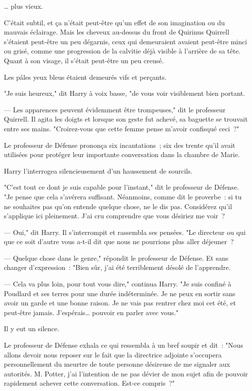 … plus vieux.

C'était subtil, et ça n'était peut-être qu'un effet de son imagination ou du mauvais éclairage. Mais les cheveux au-dessus du front de Quirinus Quirrell s'étaient peut-être un peu dégarnis, ceux qui demeuraient avaient peut-être minci ou grisé, comme une progression de la calvitie déjà visible à l'arrière de sa tête. Quant à son visage, il s'était peut-être un peu creusé.

Les pâles yeux bleus étaient demeurés vifs et perçants.

"Je suis heureux," dit Harry à voix basse, "de vous voir visiblement bien portant.

--- Les apparences peuvent évidemment être trompeuses," dit le professeur Quirrell. Il agita les doigts et lorsque son geste fut achevé, sa baguette se trouvait entre ses mains. "Croirez-vous que cette femme pense m'avoir confisqué ceci~?"

Le professeur de Défense prononça six incantations~; six des trente qu'il avait utilisées pour protéger leur importante conversation dans la chambre de Marie.

Harry l'interrogea silencieusement d'un haussement de sourcils.

"C'est tout ce dont je suis capable pour l'instant," dit le professeur de Défense. "Je pense que cela s'avérera suffisant. Néanmoins, comme dit le proverbe~: si tu ne souhaites pas qu'on entende quelque chose, ne le dis pas. Considérez qu'il s'applique ici pleinement. J'ai cru comprendre que vous désiriez me voir~?

--- Oui," dit Harry. Il s'interrompit et rassembla ses pensées. "Le directeur ou qui que ce soit d'autre vous a-t-il dit que nous ne pourrions plus aller déjeuner~?

--- Quelque chose dans le genre," répondit le professeur de Défense. Et sans changer d'expression~: "Bien sûr, j'ai été terriblement désolé de l'apprendre.

--- Cela va plus loin, pour tout vous dire," continua Harry. "Je suis confiné à Poudlard et ses terres pour une durée indéterminée. Je ne peux en sortir sans avoir un garde et une bonne raison. Je ne vais pas rentrer chez moi cet été, et peut-être jamais. J'espérais… pouvoir en parler avec vous."

Il y eut un silence.

Le professeur de Défense exhala ce qui ressembla à un bref soupir et dit~: "Nous allons devoir nous reposer sur le fait que la directrice adjointe s'occupera personnellement du meurtre de toute personne désireuse de me signaler aux autorités. M. Potter, j'ai l'intention de ne pas dévier de mon sujet afin de pouvoir rapidement achever cette conversation. Est-ce compris~?"

